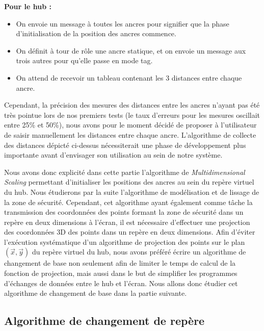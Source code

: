 \bigskip

\textbf{Pour le hub :}

\begin{itemize}
   \item On envoie un message à toutes les ancres pour signifier que la phase d'initialisation de la position des ancres commence.
   \item On définit à tour de rôle une ancre statique, et on envoie un message aux trois autres pour qu'elle passe en mode tag.
   \item On attend de recevoir un tableau contenant les 3 distances entre chaque ancre.
\end{itemize}

Cependant, la précision des mesures des distances entre les ancres n'ayant pas été très pointue lors de nos premiers tests (le taux d'erreurs pour les mesures oscillait entre 25\% et 50\%), nous avons pour le moment décidé de proposer à l'utilisateur de saisir manuellement les distances entre chaque ancre. L'algorithme de collecte des distances dépicté ci-dessus nécessiterait une phase de développement plus importante avant d'envisager son utilisation au sein de notre système.

\bigskip

Nous avons donc explicité dans cette partie l'algorithme de \emph{Multidimensional Scaling} permettant d'initialiser les positions des ancres au sein du repère virtuel du hub. Nous étudierons par la suite l'algorithme de modélisation et de lissage de la zone de sécurité. Cependant, cet algorithme ayant également comme tâche la transmission des coordonnées des points formant la zone de sécurité dans un repère en deux dimensions à l'écran, il est nécessaire d'effectuer une projection des coordonnées 3D des points dans un repère en deux dimensions. Afin d'éviter l'exécution systématique d'un algorithme de projection des points sur le plan $(\vec{x}, \vec{y})$ du repère virtuel du hub, nous avons préféré écrire un algorithme de changement de base non seulement afin de limiter le temps de calcul de la fonction de projection, mais aussi dans le but de simplifier les programmes d'échanges de données entre le hub et l'écran. Nous allons donc étudier cet algorithme de changement de base dans la partie suivante.

\subsection{Algorithme de changement de repère}

